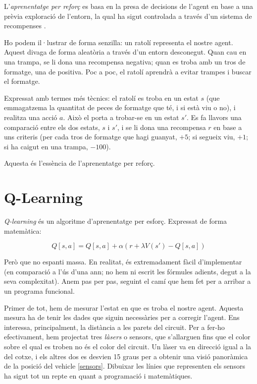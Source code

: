 L'\emph{aprenentatge per reforç} es basa en la presa de decisions de l'agent en base
a una prèvia exploració de l'entorn, la qual ha sigut controlada a través d'un sistema
de recompenses \cite{reinflnbk}.

Ho podem il·lustrar de forma senzilla: un ratolí representa el nostre agent. Aquest divaga
de forma aleatòria a través d'un entorn desconegut. Quan cau en una trampa, se li dona una
recompensa negativa; quan es troba amb un tros de formatge, una de positiva. Poc a poc,
el ratolí aprendrà a evitar trampes i buscar el formatge.

Expressat amb termes més tècnics: el ratolí es troba en un estat \(s\) (que
emmagatzema la quantitat de peces de formatge que té, i si està viu o no), i
realitza una acció \(a\). Això el porta a trobar-se en un estat \(s'\).
Es fa llavors una comparació entre els dos estats, \(s\) i \(s'\), i se
li dona una recompensa \(r\) en base a uns criteris (per cada tros de formatge
que hagi guanyat, \(+5\); si segueix viu, \(+1\); si ha caigut en una trampa,
\(-100\)).

Aquesta és l'essència
de l'aprenentatge per reforç.

\section{Q-Learning}

\emph{Q-learning} és un algoritme d'aprenentatge per esforç. Expressat de forma
matemàtica:

\begin{equation} \label{eq:qlearning}
Q[s, a] = Q[s, a] + \alpha(r + \lambda V(s') - Q[s, a])
\end{equation}

Però que no espanti massa. En realitat, és extremadament fàcil d'implementar (en 
comparació a l'ús d'una \ac{ann}; no hem ni escrit les fórmules adients, degut a la seva
complexitat). Anem pas per pas, seguint el camí que hem fet per a arribar a 
un programa funcional.

Primer de tot, hem de mesurar l'estat en que es troba el nostre agent. Aquesta mesura ha de tenir les dades
que siguin necessàries per a corregir l'agent. Ens interessa, principalment, la distància
a les parets del circuit. Per a fer-ho efectivament, hem projectat tres \emph{làsers} o
sensors, que s'allarguen fins que el color sobre el qual es troben no és el color del circuit.
Un làser va en direcció igual a la del cotxe, i els altres dos es desvien 15 graus per a obtenir
una visió panoràmica de la posició del vehicle \ref{sensors}. Dibuixar les línies que
representen els sensors ha sigut tot un repte en quant a programació i matemàtiques.


